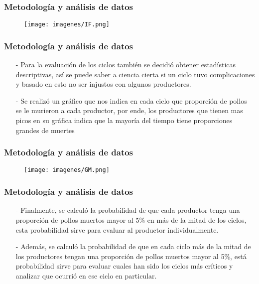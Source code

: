 \documentclass[11pt]{beamer}
\begin{document}
\begin{frame}
\frametitle{Metodología y análisis de datos}
\begin{figure}[!h]
        \texttt{[image: imagenes/IF.png]}
        \label{figura1}
\end{figure}
\end{frame}

\begin{frame}
\frametitle{Metodología y análisis de datos}
\begin{itemize}
\justifying
\item[-]Para la evaluación de los ciclos también se decidió obtener estadísticas descriptivas, así se puede saber a ciencia cierta si un ciclo tuvo complicaciones y basado en esto no ser injustos con algunos productores.
\item[-]Se realizó un gráfico que nos indica en cada ciclo que proporción de pollos se le murieron a cada productor, por ende, los productores que tienen mas picos en su gráfica indica que la mayoría del tiempo tiene proporciones grandes de muertes
\end{itemize}
\end{frame}

\begin{frame}
\frametitle{Metodología y análisis de datos}
\begin{figure}[!h]
        \texttt{[image: imagenes/GM.png]}
        \label{figura1}
\end{figure}
\end{frame}

\begin{frame}
\frametitle{Metodología y análisis de datos}
\begin{itemize}
\justifying
\item[-]Finalmente, se calculó la probabilidad de que cada productor tenga una proporción de pollos muertos mayor al 5\% en más de la mitad de los ciclos, esta probabilidad sirve para evaluar al productor individualmente.
\item[-]Además, se calculó la probabilidad de que en cada ciclo más de la mitad de los productores tengan una proporción de pollos muertos mayor al 5\%, está probabilidad sirve para evaluar cuales han sido los ciclos más críticos y analizar que ocurrió en ese ciclo en particular.
\end{itemize}
\end{frame}
\end{document}

